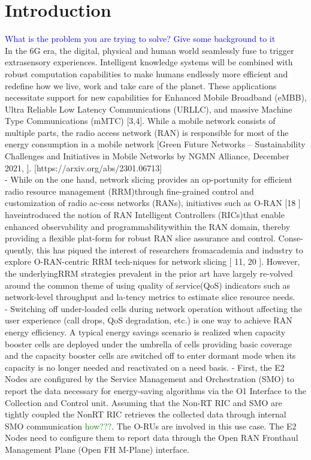 \documentclass[conference]{IEEEtran}
\begin{document}
\section{Introduction}
\textcolor{blue}{What is the problem you are trying to solve? Give some background to it}\\
In the 6G era, the digital, physical and human world seamlessly fuse to trigger extrasensory experiences. Intelligent knowledge systems will be combined with robust computation capabilities to make humans endlessly more efficient and redefine how we live, work and take care of the planet. These applications necessitate support for new capabilities for Enhanced Mobile Broadband (eMBB), Ultra Reliable Low Latency Communications (URLLC), and massive Machine Type Communications (mMTC) [3,4].
While a mobile network consists of multiple parts, the radio access network (RAN) is responsible for most of the energy consumption in a mobile network [Green Future Networks – Sustainability Challenges and Initiatives in Mobile Networks by NGMN Alliance, December 2021, \href{https://www.ngmn.org/wp-content/uploads/210719_NGMN_GFN_Sustainability-Challenges-andInitiatives_v1.0.pdf}]. [https://arxiv.org/abs/2301.06713] \\
- While on the one hand, network slicing provides an op-portunity for efficient radio resource management (RRM)through fine-grained control and customization of radio ac-cess networks (RANs), initiatives such as O-RAN [18 ] haveintroduced the notion of RAN Intelligent Controllers (RICs)that enable enhanced observability and programmabilitywithin the RAN domain, thereby providing a flexible plat-form for robust RAN slice assurance and control. Conse-quently, this has piqued the interest of researchers fromacademia and industry to explore O-RAN-centric RRM tech-niques for network slicing [ 11, 20 ]. However, the underlyingRRM strategies prevalent in the prior art have largely re-volved around the common theme of using quality of service(QoS) indicators such as network-level throughput and la-tency metrics to estimate slice resource needs. \\
- Switching off under-loaded cells during network operation without affecting the user experience (call drops, QoS degradation, etc.) is one way to achieve RAN energy efficiency. A typical energy savings scenario is realized when capacity booster cells are deployed under the umbrella of cells providing basic coverage and the capacity booster cells are switched off to enter dormant mode when its capacity is no longer needed and reactivated on a need basis. - First, the E2 Nodes are configured by the Service Management and Orchestration (SMO) to report the data necessary for energy-saving algorithms via the O1 Interface to the Collection and Control unit. Assuming that the Non-RT RIC and SMO are tightly coupled the NonRT RIC retrieves the collected data through internal SMO communication \textcolor{green}{how???}. The O-RUs are involved in this use case. The E2 Nodes need to configure them to report data through the Open RAN Fronthaul Management Plane (Open FH M-Plane) interface.\\
\end{document}
